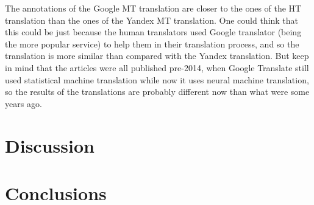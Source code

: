 \begin{table}[ht]
\centering
{}
\caption{Macro-Evaluation of how close the annotations of MT and MT+PE translation are to the annotations of HT}
\label{table:results_comparasion_translations_macro}
\end{table}

The annotations of the Google MT translation are closer to the ones of the HT translation than the ones of the Yandex MT translation. One could think that this could be just because the human translators used Google translator (being the more popular service) to help them in their translation process, and so the translation is more similar than compared with the Yandex translation. But keep in mind that the articles were all published pre-2014, when Google Translate still used statistical machine translation while now it uses neural machine translation, so the results of the translations are probably different now than what were some years ago. 



\section{Discussion}





\section{Conclusions}




  
